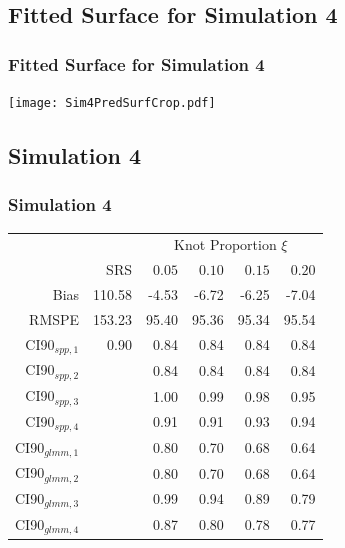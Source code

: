 \documentclass[mathserif,compress]{beamer}
\begin{document}

\subsection{Fitted Surface for Simulation 4}
\begin{frame}
\frametitle{Fitted Surface for Simulation 4}

	\begin{center} 
		\texttt{[image: Sim4PredSurfCrop.pdf]} 
	\end{center}

\end{frame}


\subsection{Simulation 4}
\begin{frame}
\frametitle{Simulation 4}

\begin{table}[ht]
\begin{center}
\begin{tabular}{rrrrrr}
	\hline
	&  & \multicolumn{4}{c}{Knot Proportion $\xi$} \\ 
	& SRS & $0.05$ & $0.10$ & $0.15$ & $0.20$ \\ 
	\hline
	Bias & 110.58 & -4.53 & -6.72 & -6.25 & -7.04 \\ 
  RMSPE & 153.23 & 95.40 & 95.36 & 95.34 & 95.54 \\ 
  CI90$_{spp,1}$ & 0.90 & 0.84 & 0.84 & 0.84 & 0.84 \\ 
  CI90$_{spp,2}$ &  & 0.84 & 0.84 & 0.84 & 0.84 \\ 
  CI90$_{spp,3}$ &  & 1.00 & 0.99 & 0.98 & 0.95 \\ 
  CI90$_{spp,4}$ &  & 0.91 & 0.91 & 0.93 & 0.94 \\ 
  CI90$_{glmm,1}$ &  & 0.80 & 0.70 & 0.68 & 0.64 \\ 
  CI90$_{glmm,2}$ &  & 0.80 & 0.70 & 0.68 & 0.64 \\ 
  CI90$_{glmm,3}$ &  & 0.99 & 0.94 & 0.89 & 0.79 \\ 
  CI90$_{glmm,4}$ &  & 0.87 & 0.80 & 0.78 & 0.77 \\ 
   \hline
\end{tabular}
\end{center}
\end{table}

\end{frame}
\end{document}
